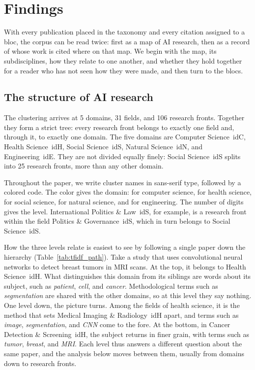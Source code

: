 \documentclass[10pt,twocolumn,a4paper]{article}
\newcommand{\cl}[3]{\textsf{#1}~\csname id#2\endcsname{#3}}
\begin{document}
	\section{Findings}
	\label{sec:findings}
	
	With every publication placed in the taxonomy and every citation assigned to a bloc, the corpus can be read twice: first as a map of AI research, then as a record of whose work is cited where on that map. We begin with the map, its subdisciplines, how they relate to one another, and whether they hold together for a reader who has not seen how they were made, and then turn to the blocs.
	
	\subsection{The structure of AI research}
	
	The clustering arrives at 5 domains, 31 fields, and 106 research fronts. Together they form a strict tree: every research front belongs to exactly one field and, through it, to exactly one domain. The five domains are \cl{Computer Science}{C}{0}, \cl{Health Science}{H}{1}, \cl{Social Science}{S}{2}, \cl{Natural Science}{N}{3}, and \cl{Engineering}{E}{4}. They are not divided equally finely: \cl{Social Science}{S}{2} splits into 25 research fronts, more than any other domain.
	
	Throughout the paper, we write cluster names in sans-serif type, followed by a colored code. The color gives the domain:  for computer science,  for health science,  for social science,  for natural science, and  for engineering. The number of digits gives the level. \cl{International Politics \& Law}{S}{220}, for example, is a research front within the field \cl{Politics \& Governance}{S}{22}, which in turn belongs to \cl{Social Science}{S}{2}.
	
	How the three levels relate is easiest to see by following a single paper down the hierarchy (Table~\ref{tab:tfidf_path}). Take a study that uses convolutional neural networks to detect breast tumors in MRI scans. At the top, it belongs to \cl{Health Science}{H}{1}. What distinguishes this domain from its siblings are words about its subject, such as \textit{patient}, \textit{cell}, and \textit{cancer}. Methodological terms such as \textit{segmentation} are shared with the other domains, so at this level they say nothing. One level down, the picture turns. Among the fields of health science, it is the method that sets \cl{Medical Imaging \& Radiology}{H}{10} apart, and terms such as \textit{image}, \textit{segmentation}, and \textit{CNN} come to the fore. At the bottom, in \cl{Cancer Detection \& Screening}{H}{102}, the subject returns in finer grain, with terms such as \textit{tumor}, \textit{breast}, and \textit{MRI}. Each level thus answers a different question about the same paper, and the analysis below moves between them, usually from domains down to research fronts.
	
\end{document}
